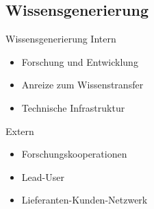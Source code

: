 \subsection{Wissensgenerierung}
\begin{frame}{Wissensgenerierung}
Intern
\begin{itemize}
 \item Forschung und Entwicklung
 \item Anreize zum Wissenstransfer
 \item Technische Infrastruktur
\end{itemize}
Extern
\begin{itemize}
 \item Forschungskooperationen
 \item Lead-User
 \item Lieferanten-Kunden-Netzwerk
\end{itemize}
\end{frame}



